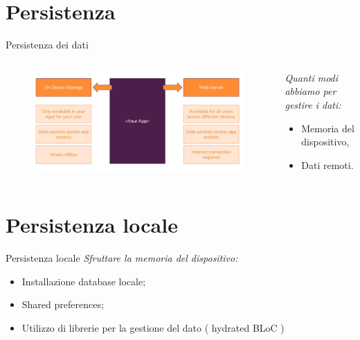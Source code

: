 \documentclass{../libs/presentation_format}
\begin{document}

\section{Persistenza}
\begin{frame}{Persistenza dei dati}
	\begin{minipage}[0.2\textheight]{\textwidth}
		\begin{columns}[T]
			\begin{column}{0.4\textwidth}
				\begin{figure}[htpb]
					\centering
					\includegraphics[scale=0.18]{../libs/storing-data}
				\end{figure}
			\end{column}
			\begin{column}{0.6\textwidth}
				\emph{Quanti modi abbiamo per gestire i dati:}
				\begin{itemize}
					\item Memoria del dispositivo,
					\item Dati remoti.
				\end{itemize}
			\end{column}
		\end{columns}
	\end{minipage}
\end{frame}


\section{Persistenza locale}
\begin{frame}{Persistenza locale}
	\emph{Sfruttare la memoria del dispositivo:}
	\begin{itemize}
		\item Installazione database locale;
		\item Shared preferences;
		\item Utilizzo di librerie per la gestione del dato ( hydrated BLoC )
	\end{itemize}
\end{frame}
\end{document}
